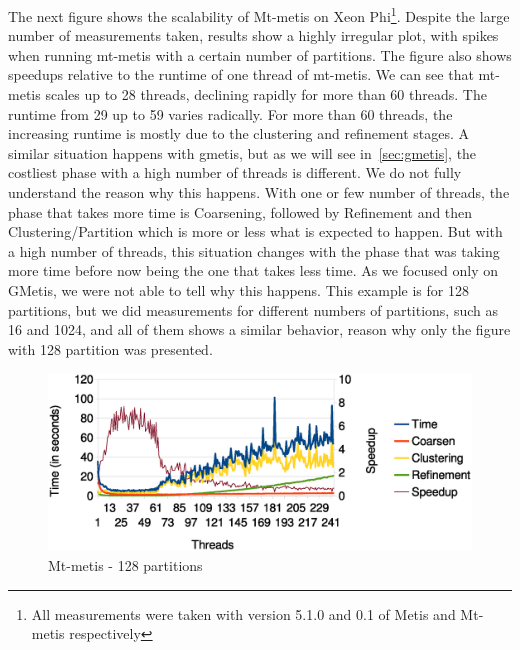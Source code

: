 \documentclass[abstract=on,9pt,twocolumn]{scrartcl}
\begin{document}
The next figure shows the scalability of Mt-metis on Xeon
Phi\footnote{All measurements were taken with version 5.1.0 and 0.1
of Metis and Mt-metis respectively}. Despite
the large number of measurements taken, results show a highly irregular plot, with spikes when
running mt-metis with a certain number of partitions. The figure also
shows speedups relative to the runtime of one thread of mt-metis. We can
see that mt-metis scales up to 28 threads, declining rapidly for more
than 60 threads. The runtime from 29 up to 59 varies radically. For more
than 60 threads, the increasing runtime is mostly due to the clustering
and refinement stages. A similar situation happens with gmetis, but as
we will see in~\ref{sec:gmetis}, the costliest phase with a high number of
threads is different. 
We do not fully understand the reason why this happens. With one or
few number of threads, the phase that takes more time is Coarsening,
followed by Refinement and then Clustering/Partition which is more or
less what is expected to happen. But with a high number of threads, this
situation changes with the phase that was taking more time before now
being the one that takes less time. As we focused only on GMetis, we were
not able to tell why this happens.
This example is for 128 partitions, but we did
measurements for different numbers of partitions, such as 16 and 1024,
and all of them shows a similar behavior, reason why only the figure
with 128 partition was presented.

\begin{center}
\begin{figure}[htb]
    \includegraphics[width=\columnwidth]{img/mtmetis128.eps}
    \caption{Mt-metis - 128 partitions}
    \label{img:mtmetis128}
\end{figure}
\end{center}


\end{document}
